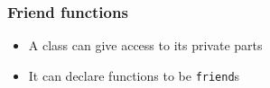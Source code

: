\begin{frame}
  \frametitle{Friend functions}
  \begin{itemize}
    \item A class can give access to its private parts
    \item It can declare functions to be {\tt friend}s
  \end{itemize}
\end{frame}



